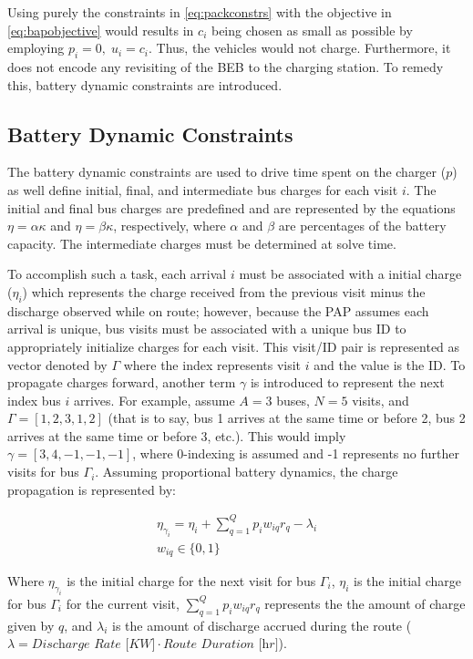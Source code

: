 \documentclass[letterpaper, 10pt, conference]{IEEEtran}
\begin{document}
Using purely the constraints in \eqref{eq:packconstrs} with the objective in \eqref{eq:bapobjective} would results in \(c_i\) being chosen as small as possible by employing \(p_i = 0,\; u_i = c_i\). Thus, the vehicles would not charge. Furthermore, it does not encode any revisiting of the BEB to the charging station. To remedy this, battery dynamic constraints are introduced.

\subsection{Battery Dynamic Constraints}
The battery dynamic constraints are used to drive time spent on the charger (\(p\)) as well define initial, final, and intermediate bus charges for each visit \(i\). The initial and final bus charges are predefined and are represented by the equations \(\eta = \alpha \kappa\) and \(\eta = \beta \kappa\), respectively, where \(\alpha\) and \(\beta\) are percentages of the battery capacity. The intermediate charges must be determined at solve time.

To accomplish such a task, each arrival \(i\) must be associated with a initial charge (\(\eta_i\)) which represents the charge received from the previous visit minus the discharge observed while on route; however, because the PAP assumes each arrival is unique, bus visits must be associated with a unique bus ID to appropriately initialize charges for each visit. This visit/ID pair is represented as vector denoted by \(\Gamma\) where the index represents visit \(i\) and the value is the ID. To propagate charges forward, another term \(\gamma\) is introduced to represent the next index bus \(i\) arrives. For example, assume \(A = 3\) buses, \(N = 5\) visits, and \(\Gamma = [1,2,3,1,2]\) (that is to say, bus 1 arrives at the same time or before 2, bus 2 arrives at the same time or before 3, etc.). This would imply \(\gamma = [3,4,-1,-1,-1]\), where 0-indexing is assumed and -1 represents no further visits for bus \(\Gamma_i\). Assuming proportional battery dynamics, the charge propagation is represented by:

\begin{subequations}
\begin{align*}
    \eta_{\gamma_i} = \eta_i + \sum_{q=1}^Q p_i w_{iq} r_q - \lambda_i \\
    w_{iq} \in \{0,1\}
\end{align*}
\end{subequations}

Where \(\eta_{\gamma_i}\) is the initial charge for the next visit for bus \(\Gamma_i\), \(\eta_i\) is the initial charge for bus \(\Gamma_i\) for the current visit, \(\sum_{q=1}^Q p_i w_{iq} r_q\) represents the the amount of charge given by \(q\), and \(\lambda_i\) is the amount of discharge accrued during the route (\(\lambda = \textit{Discharge Rate [KW]}\cdot\textit{Route Duration [hr]}\)).
\end{document}
